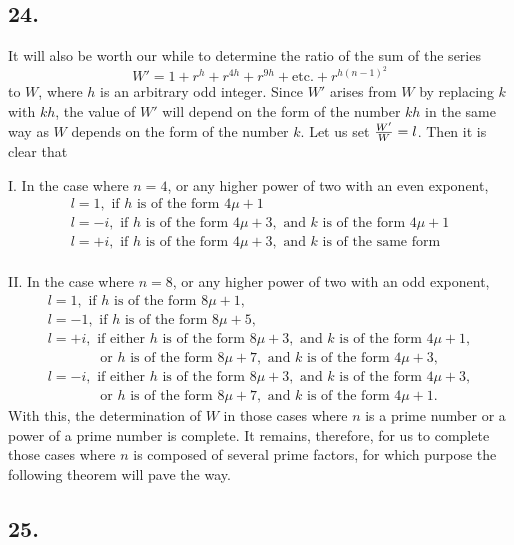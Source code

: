 \documentclass[twoside,12pt]{memoir}
\let\oldfrac\frac
\def\frac#1#2{\mathchoice{\tfrac{#1}{#2}}{\oldfrac{#1}{#2}}{\genfrac{}{}{}{2}{#1}{#2\mathstrut}}{\genfrac{}{}{}{3}{#1}{#2\mathstrut}}}
\begin{document}
\subsection*{24.}

It will also be worth our while to determine the ratio of the sum of the series
\[ W' = 1 + r^h + r^{4h} + r^{9h} + \text{etc{.}} + r^{h(n-1)^2} \]
to \(W\), where \(h\) is an arbitrary odd integer. Since \(W'\) arises from \(W\) by replacing \(k\) with \(kh\), the value of \(W'\) will depend on the form of the number \(kh\) in the same way as \(W\) depends on the form of the number \(k\). Let us set \(\frac{W'}{W} = l\).  Then it is clear that

I. In the case where \(n = 4\), or any higher power of two with an even exponent,
\[\begin{array}{l}
l = 1,\text{ if }h\text{ is of the form }4\mu+1\\ 
l = -i,\text{ if }h\text{ is of the form }4\mu+3,\text{ and }k\text{ is of the form }4\mu+1\\
l = +i,\text{ if }h\text{ is of the form }4\mu+3,\text{ and }k\text{ is of the same form}\\
\end{array}\]

II. In the case where \(n = 8\), or any higher power of two with an odd exponent,
\[\begin{array}{l} 
l = 1, \text{ if }h\text{ is of the form }8\mu+1, \\
l = -1, \text{ if }h\text{ is of the form }8\mu+5, \\
l = +i, \text{ if either }h\text{ is of the form }8\mu+3, \text{ and } k\text{ is of the form }4\mu+1,\\
\phantom{l = +i} \quad \text{or }h\text{ is of the form }8\mu+7, \text{ and } k\text{ is of the form }4\mu+3,\\
l = -i, \text{ if either }h\text{ is of the form }8\mu+3, \text{ and } k\text{ is of the form }4\mu+3, \\
\phantom{l = -i}\quad \text{or }h\text{ is of the form }8\mu+7, \text{ and } k\text{ is of the form }4\mu+1.
\end{array}\]
With this, the determination of \(W\) in those cases where \(n\) is a prime number or a power of a prime number is complete. It remains, therefore, for us to complete those cases where \(n\) is composed of several prime factors, for which purpose the following theorem will pave the way.
%

\subsection*{25.}
\end{document}
